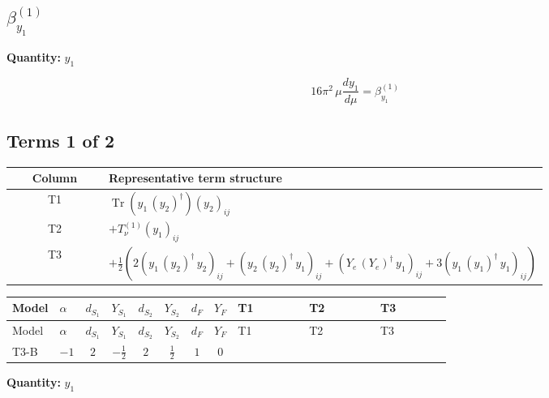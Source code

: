 \documentclass[8pt]{article}
\begin{document}
\begin{landscape}
\section*{$\beta_{y_1}^{(1)}$}
\noindent\textbf{Quantity: }$y_1$\par\smallskip
\[16\pi^2\,\mu\frac{d y_1}{d\mu}=\beta_{y_1}^{(1)}\]
\subsection*{Terms 1 of 2}
\begin{center}
\begin{tabular}{@{}c >{\raggedright\arraybackslash}p{0.82\linewidth}@{}}
\toprule
Column & Representative term structure \\
\midrule
T1 & \(\displaystyle \operatorname{Tr}\!\left({y_1}\,\left({y_2}\right)^{\dagger}\right) \left({y_2}\right)_{ij}\) \\
\midrule
T2 & \(\displaystyle +T_{\nu}^{(1)} \left({y_1}\right)_{ij}\) \\
\midrule
T3 & \(\displaystyle +\frac{1}{2} (2 \left({y_1}\,\left({y_2}\right)^{\dagger}\,{y_2}\right)_{ij}+\left({y_2}\,\left({y_2}\right)^{\dagger}\,{y_1}\right)_{ij}+\left({Y_e}\,\left({Y_e}\right)^{\dagger}\,{y_1}\right)_{ij}+3 \left({y_1}\,\left({y_1}\right)^{\dagger}\,{y_1}\right)_{ij})\) \\
\midrule
\bottomrule
\end{tabular}
\end{center}
\smallskip
\tiny
\begin{longtable}{@{}llcccccc >{\raggedright\arraybackslash}p{0.21\linewidth} >{\raggedright\arraybackslash}p{0.21\linewidth} >{\raggedright\arraybackslash}p{0.21\linewidth}@{}}
\toprule
Model & $\alpha$ & $d_{S_1}$ & $Y_{S_1}$ & $d_{S_2}$ & $Y_{S_2}$ & $d_F$ & $Y_F$ & T1 & T2 & T3 \\
\midrule
\endfirsthead
\toprule
Model & $\alpha$ & $d_{S_1}$ & $Y_{S_1}$ & $d_{S_2}$ & $Y_{S_2}$ & $d_F$ & $Y_F$ & T1 & T2 & T3 \\
\midrule
\endhead
T3-B & $-1$ & $2$ & $-\frac{1}{2}$ & $2$ & $\frac{1}{2}$ & $1$ & $0$ & \scriptsize\adjustbox{max width=\linewidth}{$\begin{gathered} \operatorname{Tr}\!\left({y_1}\,\left({y_2}\right)^{\dagger}\right) \left({y_2}\right)_{ij}\end{gathered}$} & \scriptsize\adjustbox{max width=\linewidth}{$\begin{gathered} +T_{\nu}^{(1)} \left({y_1}\right)_{ij}\end{gathered}$} & \scriptsize\adjustbox{max width=\linewidth}{$\begin{gathered} +\frac{1}{2} (2 \left({y_1}\,\left({y_2}\right)^{\dagger}\,{y_2}\right)_{ij}+\left({y_2}\,\left({y_2}\right)^{\dagger}\,{y_1}\right)_{ij}+\left({Y_e}\,\left({Y_e}\right)^{\dagger}\,{y_1}\right)_{ij}+3 \left({y_1}\,\left({y_1}\right)^{\dagger}\,{y_1}\right)_{ij})\end{gathered}$} \\
\midrule
\bottomrule
\end{longtable}
\clearpage
\noindent\textbf{Quantity: }$y_1$\par\smallskip

\end{landscape}
\end{document}
